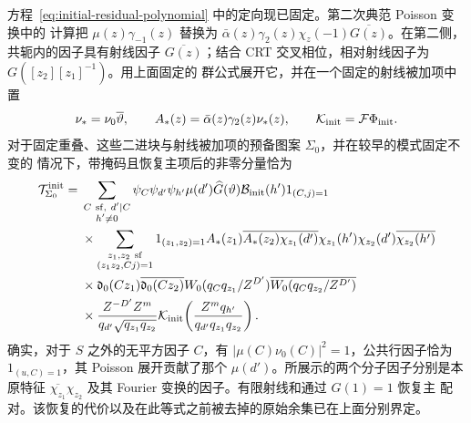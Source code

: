 方程~\eqref{eq:initial-residual-polynomial} 中的定向现已固定。第二次典范 Poisson 变换中的
计算把 \(\mu(z)\gamma_{-1}(z)\) 替换为
\(\bar\alpha(z)\gamma_2(z)\chi_z(-1)\overline{G(z)}\)。在第二侧，共轭内的因子具有射线因子
\(\overline{G(z)}\)；结合 CRT 交叉相位，相对射线因子为 \(G([z_2][z_1]^{-1})\)。用上面固定的
群公式展开它，并在一个固定的射线被加项中置
\[
 \nu_*=\nu_0\overline\vartheta,\qquad
 A_*(z)=\bar\alpha(z)\gamma_2(z)\nu_*(z),\qquad
 \mathcal K_{\rm init}=\mathcal F\Phi_{\rm init}.
\]
对于固定重叠、这些二进块与射线被加项的预备图案 \(\Sigma_0\)，并在较早的模式固定不变的
情况下，带掩码且恢复主项后的非零分量恰为
\begin{equation}\label{eq:initial-formal-component}
 \begin{split}
 \mathcal T^{\rm init}_{\Sigma_0}={}&
 \sum_{\substack{C\ {\rm sf},\ d'\mid C\\h'\ne0}}
 \psi_C\psi_{d'}\psi_{h'}\mu(d')\widehat G(\vartheta)
 \mathcal B_{\rm init}(h')1_{(C,j)=1}\\
 &\times\sum_{\substack{z_1,z_2\ {\rm sf}\\(z_1z_2,Cj)=1}}
 1_{(z_1,z_2)=1}
 A_*(z_1)\overline{A_*(z_2)}
 \overline{\chi_{z_1}(d')}\chi_{z_1}(h')
 \chi_{z_2}(d')\overline{\chi_{z_2}(h')}\\
 &\times\mathfrak d_0(Cz_1)\overline{\mathfrak d_0(Cz_2)}
 W_0(q_Cq_{z_1}/Z^{D'})\overline{W_0(q_Cq_{z_2}/Z^{D'})}\\
 &\times\frac{Z^{-D'}Z^m}{q_{d'}\sqrt{q_{z_1}q_{z_2}}}
 \mathcal K_{\rm init}\!\left(
       \frac{Z^mq_{h'}}{q_{d'}q_{z_1}q_{z_2}}\right).
 \end{split}
\end{equation}
确实，对于 \(S\) 之外的无平方因子 \(C\)，有 \(|\mu(C)\nu_0(C)|^2=1\)，公共行因子恰为
\(1_{(u,C)=1}\)，其 Poisson 展开贡献了那个 \(\mu(d')\)。所展示的两个分子因子分别是本原特征
\(\overline{\chi_{z_1}}\chi_{z_2}\) 及其 Fourier 变换的因子。有限射线和通过 \(G(1)=1\) 恢复主
配对。该恢复的代价以及在此等式之前被去掉的原始余集已在上面分别界定。

